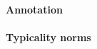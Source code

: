 \documentclass[10pt,letterpaper]{article}
\begin{document}
\paragraph{Annotation}

\paragraph{Typicality norms}
\end{document}

